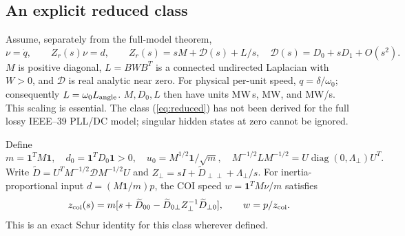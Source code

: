 \documentclass[11pt]{article}
\newcommand{\diag}{\operatorname{diag}}
\newcommand{\one}{\mathbf{1}}
\begin{document}
\subsection{An explicit reduced class}
Assume, separately from the full-model theorem,
\begin{equation}
 \nu=\dot q,\qquad Z_r(s)\nu=d,\qquad
 Z_r(s)=sM+\mathcal D(s)+L/s,\quad
 \mathcal D(s)=D_0+sD_1+O(s^2). \label{eq:reduced}
\end{equation}
$M$ is positive diagonal, $L=BWB^T$ is a connected undirected
Laplacian with $W>0$, and $\mathcal D$ is real analytic near zero.
For physical per-unit speed, $q=\delta/\omega_0$; consequently
$L=\omega_0 L_{\rm angle}$. $M,D_0,L$ then have units MW\,s, MW,
and MW/s. This scaling is essential.
The class (\ref{eq:reduced}) has not been derived for the full lossy
IEEE--39 PLL/DC model; singular hidden states at zero cannot be ignored.

Define
\[
 m=\one^TM\one,\quad d_0=\one^TD_0\one>0,\quad
 u_0=M^{1/2}\one/\sqrt m,\quad
 M^{-1/2}LM^{-1/2}=U\diag(0,\Lambda_\perp)U^T .
\]
Write $\widetilde D=U^TM^{-1/2}\mathcal D M^{-1/2}U$ and
$Z_\perp=sI+\widetilde D_{\perp\perp}+\Lambda_\perp/s$.
For inertia-proportional input $d=(M\one/m)p$, the COI speed
$w=\one^TM\nu/m$ satisfies
\begin{equation}
 z_{\rm coi}(s)=m[s+\widetilde D_{00}
 -\widetilde D_{0\perp}Z_\perp^{-1}\widetilde D_{\perp0}],
 \qquad w=p/z_{\rm coi}. \label{eq:coi}
\end{equation}
This is an exact Schur identity for this class wherever defined.
\end{document}
